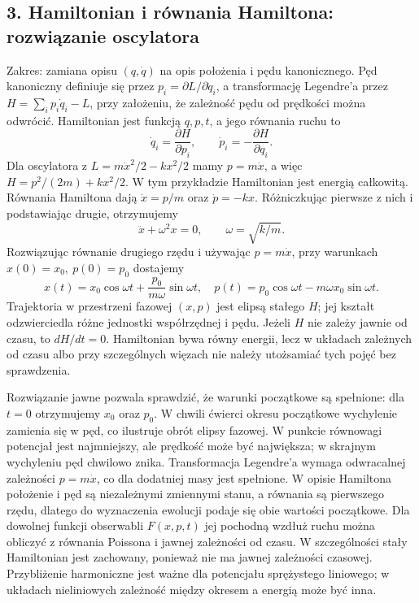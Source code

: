 \documentclass[11pt,a4paper]{article}
\begin{document}
\subsection{3. Hamiltonian i równania Hamiltona: rozwiązanie oscylatora}
Zakres: zamiana opisu \((q,\dot q)\) na opis położenia i pędu kanonicznego. Pęd kanoniczny definiuje się przez \(p_i=\partial L/\partial\dot q_i\), a transformację Legendre’a przez \(H=\sum_i p_i\dot q_i-L\), przy założeniu, że zależność pędu od prędkości można odwrócić. Hamiltonian jest funkcją \(q,p,t\), a jego równania ruchu to
\[
\dot q_i=\frac{\partial H}{\partial p_i},\qquad
\dot p_i=-\frac{\partial H}{\partial q_i}.
\]
Dla oscylatora z \(L=m\dot x^2/2-kx^2/2\) mamy \(p=m\dot x\), a więc \(H=p^2/(2m)+kx^2/2\). W tym przykładzie Hamiltonian jest energią całkowitą. Równania Hamiltona dają \(\dot x=p/m\) oraz \(\dot p=-kx\). Różniczkując pierwsze z nich i podstawiając drugie, otrzymujemy
\[
\ddot x+\omega^2x=0,\qquad \omega=\sqrt{k/m}.
\]
Rozwiązując równanie drugiego rzędu i używając \(p=m\dot x\), przy warunkach \(x(0)=x_0,\ p(0)=p_0\) dostajemy
\[
x(t)=x_0\cos\omega t+\frac{p_0}{m\omega}\sin\omega t,\quad
p(t)=p_0\cos\omega t-m\omega x_0\sin\omega t.
\]
Trajektoria w przestrzeni fazowej \((x,p)\) jest elipsą stałego \(H\); jej kształt odzwierciedla różne jednostki współrzędnej i pędu. Jeżeli \(H\) nie zależy jawnie od czasu, to \(dH/dt=0\). Hamiltonian bywa równy energii, lecz w układach zależnych od czasu albo przy szczególnych więzach nie należy utożsamiać tych pojęć bez sprawdzenia.

Rozwiązanie jawne pozwala sprawdzić, że warunki początkowe są spełnione: dla \(t=0\) otrzymujemy \(x_0\) oraz \(p_0\). W chwili ćwierci okresu początkowe wychylenie zamienia się w pęd, co ilustruje obrót elipsy fazowej. W punkcie równowagi potencjał jest najmniejszy, ale prędkość może być największa; w skrajnym wychyleniu pęd chwilowo znika. Transformacja Legendre’a wymaga odwracalnej zależności \(p=m\dot x\), co dla dodatniej masy jest spełnione. W opisie Hamiltona położenie i pęd są niezależnymi zmiennymi stanu, a równania są pierwszego rzędu, dlatego do wyznaczenia ewolucji podaje się obie wartości początkowe. Dla dowolnej funkcji obserwabli \(F(x,p,t)\) jej pochodną wzdłuż ruchu można obliczyć z równania Poissona i jawnej zależności od czasu. W szczególności stały Hamiltonian jest zachowany, ponieważ nie ma jawnej zależności czasowej. Przybliżenie harmoniczne jest ważne dla potencjału sprężystego liniowego; w układach nieliniowych zależność między okresem a energią może być inna.
\end{document}
